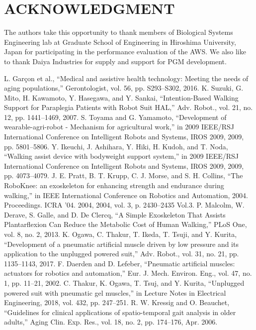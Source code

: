 \documentclass[letterpaper, 10 pt, conference]{ieeeconf}  %
\begin{document}
\section*{ACKNOWLEDGMENT}

The authors take this opportunity to thank members of Biological Systems Engineering lab at Graduate School of Engineering in Hiroshima University, Japan for participating in the performance evaluation of the AWS. We also like to thank Daiya Industries for supply and support for PGM development.  

\begin{thebibliography}{10}

	L. Garçon et al., “Medical and assistive health technology: Meeting the needs of aging populations,” Gerontologist, vol. 56, pp. S293–S302, 2016.
	K. Suzuki, G. Mito, H. Kawamoto, Y. Hasegawa, and Y. Sankai, “Intention-Based Walking Support for Paraplegia Patients with Robot Suit HAL,” Adv. Robot., vol. 21, no. 12, pp. 1441–1469, 2007.
	S. Toyama and G. Yamamoto, “Development of wearable-agri-robot - Mechanism for agricultural work,” in 2009 IEEE/RSJ International Conference on Intelligent Robots and Systems, IROS 2009, 2009, pp. 5801–5806.
	Y. Ikeuchi, J. Ashihara, Y. Hiki, H. Kudoh, and T. Noda, “Walking assist device with bodyweight support system,” in 2009 IEEE/RSJ International Conference on Intelligent Robots and Systems, IROS 2009, 2009, pp. 4073–4079.
	J. E. Pratt, B. T. Krupp, C. J. Morse, and S. H. Collins, “The RoboKnee: an exoskeleton for enhancing strength and endurance during walking,” in IEEE International Conference on Robotics and Automation, 2004. Proceedings. ICRA ’04. 2004, 2004, vol. 3, p. 2430–2435 Vol.3.
	P. Malcolm, W. Derave, S. Galle, and D. De Clercq, “A Simple Exoskeleton That Assists Plantarflexion Can Reduce the Metabolic Cost of Human Walking,” PLoS One, vol. 8, no. 2, 2013.
	K. Ogawa, C. Thakur, T. Ikeda, T. Tsuji, and Y. Kurita, “Development of a pneumatic artificial muscle driven by low pressure and its application to the unplugged powered suit,” Adv. Robot., vol. 31, no. 21, pp. 1135–1143, 2017.
	F. Daerden and D. Lefeber, “Pneumatic artificial muscles: actuators for robotics and automation,” Eur. J. Mech. Environ. Eng., vol. 47, no. 1, pp. 11–21, 2002.
	C. Thakur, K. Ogawa, T. Tsuj, and Y. Kurita, “Unplugged powered suit with pneumatic gel muscles,” in Lecture Notes in Electrical Engineering, 2018, vol. 432, pp. 247–251.
R. W. Kressig and O. Beauchet, “Guidelines for clinical applications of spatio-temporal gait analysis in older adults,” Aging Clin. Exp. Res., vol. 18, no. 2, pp. 174–176, Apr. 2006.


\end{thebibliography}
\end{document}
